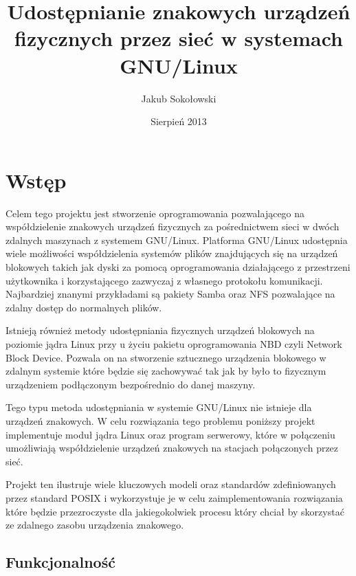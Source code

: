\documentclass[10pt]{article}
\begin{document}
\begin{titlepage}

\title{Udostępnianie znakowych urządzeń fizycznych przez sieć w systemach GNU/Linux}
\author{Jakub Sokołowski}
\date{Sierpień 2013}
\maketitle

\end{titlepage}

\tableofcontents

\newpage
\section{Wstęp}
\label{abstract}

Celem tego projektu jest stworzenie oprogramowania pozwalającego na współdzielenie znakowych urządzeń fizycznych za pośrednictwem sieci w dwóch zdalnych maszynach z systemem GNU/Linux. Platforma GNU/Linux udostępnia wiele możliwości współdzielenia systemów plików znajdujących się na urządzeń blokowych takich jak dyski za pomocą oprogramowania działającego z przestrzeni użytkownika i korzystającego zazwyczaj z własnego protokołu komunikacji. Najbardziej znanymi przykładami są pakiety Samba oraz NFS pozwalające na zdalny dostęp do normalnych plików.


Istnieją również metody udostępniania fizycznych urządzeń blokowych na poziomie jądra Linux przy u życiu pakietu oprogramowania NBD czyli Network Block Device. Pozwala on na stworzenie sztucznego urządzenia blokowego w zdalnym systemie które będzie się zachowywać tak jak by było to fizycznym urządzeniem podłączonym bezpośrednio do danej maszyny.

Tego typu metoda udostępniania w systemie GNU/Linux nie istnieje dla urządzeń znakowych. W celu rozwiązania tego problemu poniższy projekt implementuje moduł jądra Linux oraz program serwerowy, które w połączeniu umożliwiają współdzielenie urządzeń znakowych na stacjach połączonych przez sieć.

Projekt ten ilustruje wiele kluczowych modeli oraz standardów zdefiniowanych przez standard POSIX i wykorzystuje je w celu zaimplementowania rozwiązania które będzie przezroczyste dla jakiegokolwiek procesu który chciał by skorzystać ze zdalnego zasobu urządzenia znakowego.

\subsection{Funkcjonalność}
\label{functionality}
\end{document}

